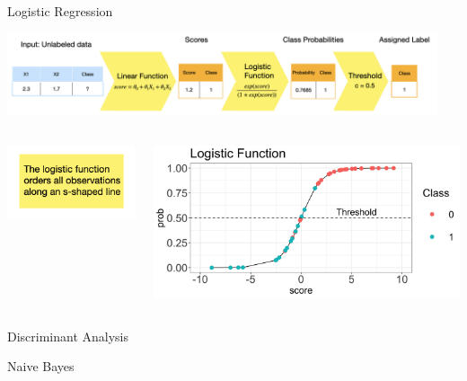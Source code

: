 \documentclass[11pt,compress,t,notes=noshow, xcolor=table]{beamer}
\begin{document}
\begin{vbframe}{Logistic Regression}
\begin{center}
  \includegraphics[width = 0.95\textwidth]{slides/supervised-classification/figure_man/nutshell-classif-logistic-regression.png}
\end{center}
\begin{columns}
\begin{column}{0.35\textwidth} 
\begin{center}
\includegraphics[width=\textwidth]{slides/supervised-classification/figure_man/nutshell-classification-text-box-logisticreg.png}
\end{center}
\end{column}
\begin{column}{0.55\textwidth} 
\begin{center}
  \includegraphics[width=1\textwidth]{slides/supervised-classification/figure/nutshell_classif_logistic_function.png}
\end{center}
\end{column}
\end{columns}



\end{vbframe}



\begin{vbframe}{Discriminant Analysis}
\end{vbframe}

\begin{vbframe}{Naive Bayes}



\end{vbframe}

\endlecture
\end{document}
